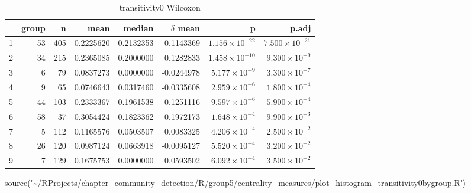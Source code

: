 \begin{table}[ht]
\centering
\begin{tabular}{rrrrrrrr}
  \toprule
 & group & n & mean & median &  $\delta$ mean & p & p.adj \\ 
  \midrule
1 & 53 & 405 & 0.2225620 & 0.2132353 & 0.1143369 & $1.156 \times 10^{-22}$ & $7.500 \times 10^{-21}$ \\ 
  2 & 34 & 215 & 0.2365085 & 0.2000000 & 0.1282833 & $1.458 \times 10^{-10}$ & $9.300 \times 10^{-9}$ \\ 
  3 & 6 & 79 & 0.0837273 & 0.0000000 & -0.0244978 & $5.177 \times 10^{-9}$ & $3.300 \times 10^{-7}$ \\ 
  4 & 9 & 65 & 0.0746643 & 0.0317460 & -0.0335608 & $2.959 \times 10^{-6}$ & $1.800 \times 10^{-4}$ \\ 
  5 & 44 & 103 & 0.2333367 & 0.1961538 & 0.1251116 & $9.597 \times 10^{-6}$ & $5.900 \times 10^{-4}$ \\ 
  6 & 58 & 37 & 0.3054424 & 0.1823362 & 0.1972173 & $1.648 \times 10^{-4}$ & $9.900 \times 10^{-3}$ \\ 
  7 & 5 & 112 & 0.1165576 & 0.0503507 & 0.0083325 & $4.206 \times 10^{-4}$ & $2.500 \times 10^{-2}$ \\ 
  8 & 26 & 120 & 0.0987124 & 0.0663918 & -0.0095127 & $5.520 \times 10^{-4}$ & $3.200 \times 10^{-2}$ \\ 
  9 & 7 & 129 & 0.1675753 & 0.0000000 & 0.0593502 & $6.092 \times 10^{-4}$ & $3.500 \times 10^{-2}$ \\ 
   \bottomrule
\end{tabular}
\caption{transitivity0 Wilcoxon}
\tiny\url{source('~/RProjects/chapter_community_detection/R/group5/centrality_measures/plot_histogram_transitivity0bygroup.R')}
\label{tab:transitivity0 Wilcoxon}
\end{table}

